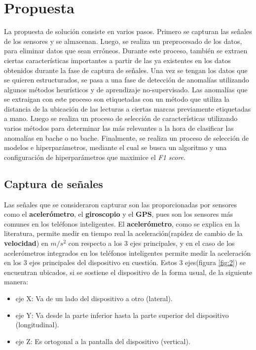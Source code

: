 \chapter{Propuesta}\label{chapter:proposal}
	La propuesta de solución consiste en varios pasos. Primero se capturan las señales de los sensores y se almacenan.
	Luego, se realiza un preprocesado de los datos, para eliminar datos que sean erróneos. Durante este proceso, también
	se extraen ciertas características importantes a partir de las ya existentes en los datos obtenidos durante la fase
	de captura de señales. Una vez se tengan los datos que se quieren estructurados, se pasa a una fase de detección de
	anomalías utilizando algunos métodos heurísticos y de aprendizaje no-supervisado. Las anomalías que se extraigan con
	este proceso son etiquetadas con un método que utiliza la distancia de la ubicación de las lecturas a ciertas marcas
	previamente etiquetadas a mano. Luego se realiza un proceso de selección de características utilizando varios métodos 
	para determinar las más relevantes a la hora de clasificar las anomalías en bache o no bache. Finalmente, se realiza 
	un proceso de selección de modelos e hiperparámetros, mediante el cual se busca un algoritmo y una configuración de 
	hiperparámetros que maximice el \emph{F1 score}.

\section{Captura de señales}
	Las señales que se consideraron capturar son las proporcionadas por sensores como el \textbf{acelerómetro},
	el \textbf{giroscopio} y el \textbf{GPS}, pues son los sensores más comunes en los teléfonos inteligentes. El
	\textbf{acelerómetro}, como se explica en la literatura, permite medir en tiempo real la aceleración(rapidez de
	cambio de la \textbf{velocidad}) en $m/s^2$ con respecto a los 3 ejes principales, y en el caso de los
	acelerómetros integrados en los teléfonos inteligentes permite medir la aceleración en los 3 ejes
	principales del dispositivo en cuestión. Estos 3 ejes(figura \ref{fig:2}) se encuentran ubicados, si se sostiene el
	dispositivo de la forma usual, de la siguiente manera:

	\begin{itemize}
		\item eje X: Va de un lado del dispositivo a otro (lateral).
		\item eje Y: Va desde la parte inferior hasta la parte superior del dispositivo (longitudinal).
		\item eje Z: Es ortogonal a la pantalla del dispositivo (vertical).
	\end{itemize}
	
